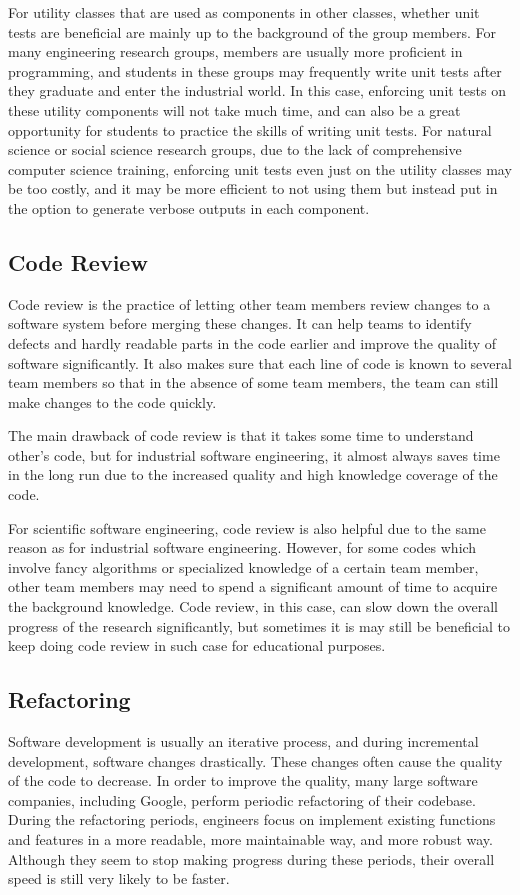 For utility classes that are used as components in other classes, whether unit tests are beneficial are mainly up to the background of the group members.
For many engineering research groups, members are usually more proficient in programming, and students in these groups may frequently write unit tests after they graduate and enter the industrial world.
In this case, enforcing unit tests on these utility components will not take much time, and can also be a great opportunity for students to practice the skills of writing unit tests.
For natural science or social science research groups, due to the lack of comprehensive computer science training, enforcing unit tests even just on the utility classes may be too costly, and it may be more efficient to not using them but instead put in the option to generate verbose outputs in each component.

\subsection{Code Review}
Code review is the practice of letting other team members review changes to a software system before merging these changes.
It can help teams to identify defects and hardly readable parts in the code earlier and improve the quality of software significantly.
It also makes sure that each line of code is known to several team members so that in the absence of some team members, the team can still make changes to the code quickly.

The main drawback of code review is that it takes some time to understand other's code, but for industrial software engineering, it almost always saves time in the long run due to the increased quality and high knowledge coverage of the code.

For scientific software engineering, code review is also helpful due to the same reason as for industrial software engineering.
However, for some codes which involve fancy algorithms or specialized knowledge of a certain team member, other team members may need to spend a significant amount of time to acquire the background knowledge.
Code review, in this case, can slow down the overall progress of the research significantly, but sometimes it is may still be beneficial to keep doing code review in such case for educational purposes.

\subsection{Refactoring}
Software development is usually an iterative process, and during incremental development, software changes drastically.
These changes often cause the quality of the code to decrease.
In order to improve the quality, many large software companies, including Google, perform periodic refactoring of their codebase.
During the refactoring periods, engineers focus on implement existing functions and features in a more readable, more maintainable way, and more robust way.
Although they seem to stop making progress during these periods, their overall speed is still very likely to be faster.

